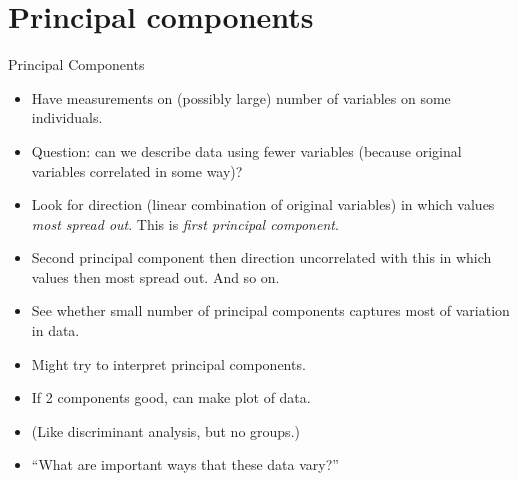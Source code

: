 \section{Principal components}
\frame{\sectionpage}

\begin{frame}[fragile]{Principal Components}
  \begin{itemize}
  \item Have measurements on (possibly large) number of variables on some individuals.
  \item Question: can we describe data using fewer variables (because original variables correlated in some way)?
  \item Look for direction (linear combination of original variables) in which values {\em most spread out}. This is {\em first principal component}.
  \item Second principal component then direction uncorrelated with this in which values then most spread out. And so on.
  \item See whether small number of principal components captures most of variation in data.
  \item Might try to interpret principal components.
  \item If 2 components good, can make plot of data.
  \item (Like discriminant analysis, but no groups.)
  \item ``What are important ways that these data vary?''
\end{itemize}

\end{frame}

